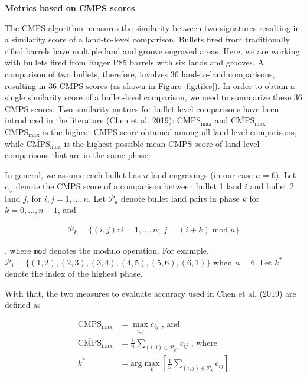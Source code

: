 \textbf{Metrics based on CMPS scores}

The CMPS algorithm measures the similarity between two signatures resulting in a similarity score of a land-to-level comparison.
Bullets fired from traditionally rifled barrels have multiple land and groove engraved areas.
Here, we are working with bullets fired from Ruger P85 barrels with six lands and grooves.
A comparison of two bullets, therefore, involves 36 land-to-land comparisons, resulting in 36 CMPS scores (as shown in Figure \ref{fig:tiles}).
In order to obtain a single similarity score of a bullet-level comparison, we need to summarize these 36 CMPS scores.
Two similarity metrics for bullet-level comparisons have been introduced in the literature (Chen et al. 2019): \(\mathrm{CMPS_{max}}\) and \(\mathrm{\overline{CMPS}_{max}}\).
\(\mathrm{CMPS_{max}}\) is the highest CMPS score obtained among all land-level comparisons, while \(\mathrm{\overline{CMPS}_{max}}\) is the highest possible mean CMPS score of land-level comparisons that are in the same phase:

In general, we assume each bullet has \(n\) land engravings (in our case \(n=6\)).
Let \(c_{ij}\) denote the CMPS score of a comparison between bullet 1 land \(i\) and bullet 2 land \(j\), for \(i,j = 1, \dots, n\).
Let \(\mathcal{P}_k\) denote bullet land pairs in phase \(k\) for \(k = 0, \dots, n-1\), and

\begin{align}
\mathcal{P}_k = \{ \left(i,j\right): i = 1, \dots, n ; \; j = \left(i + k\right) \;\mathrm{mod}\; n \}
\end{align}

, where \texttt{mod} denotes the modulo operation.
For example, \(\mathcal{P}_1 = \{ \left(1,2\right), \left(2,3\right), \left(3,4\right), \left(4,5\right), \left(5,6\right), \left(6,1\right) \}\) when \(n = 6\).
Let \(k^*\) denote the index of the highest phase.

With that, the two measures to evaluate accuracy used in Chen et al. (2019) are defined as

\begin{align}
\mathrm{CMPS_{max}} &= \max_{i,j} c_{ij} \text{ , and} \\
\mathrm{\overline{CMPS}_{max}} &= \frac{1}{n} \sum_{(i,j) \in \mathcal{P}_{k^*}} c_{ij} \text{ , where} \\
k^* &= \text{arg}\max\limits_{k} \left[  \frac{1}{n} \sum_{(i,j) \in \mathcal{P}_k} c_{ij}\right]
\end{align}

